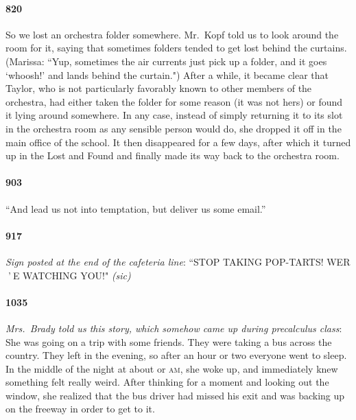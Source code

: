 \documentclass[10pt]{memoir}
\newcommand{\intro}[1]{\emph{#1}}
\begin{document}
\paragraph{820} So we lost an orchestra folder somewhere. Mr.\ Kopf told us to look around the room for it, saying that sometimes folders tended to get lost behind the curtains. (Marissa: ``Yup, sometimes the air currents just pick up a folder, and it goes `whoosh!' and lands behind the curtain.") After a while, it became clear that Taylor, who is not particularly favorably known to other members of the orchestra, had either taken the folder for some reason (it was not hers) or found it lying around somewhere. In any case, instead of simply returning it to its slot in the orchestra room as any sensible person would do, she dropped it off in the main office of the school. It then disappeared for a few days, after which it turned up in the Lost and Found and finally made its way back to the orchestra room.

\paragraph{903} ``And lead us not into temptation, but deliver us some email.''

\paragraph{917} \intro{Sign posted at the end of the cafeteria line}: ``STOP TAKING POP-TARTS! WER$\;\!\!$'$\:\!$E WATCHING YOU!" \emph{(sic)}

\paragraph{1035} \intro{Mrs.\ Brady told us this story, which somehow came up during precalculus class}: She was going on a trip with some friends. They were taking a bus across the country. They left in the evening, so after an hour or two everyone went to sleep. In the middle of the night at about  or  \textsc{am}, she woke up, and immediately knew something felt really weird. After thinking for a moment and looking out the window, she realized that the bus driver had missed his exit and was backing up on the freeway in order to get to it.
\end{document}
